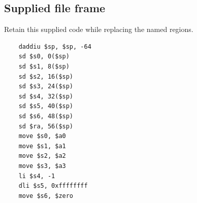 \subsection*{Supplied file frame}
Retain this supplied code while replacing the named regions.

\begin{verbatim}
    daddiu $sp, $sp, -64
    sd $s0, 0($sp)
    sd $s1, 8($sp)
    sd $s2, 16($sp)
    sd $s3, 24($sp)
    sd $s4, 32($sp)
    sd $s5, 40($sp)
    sd $s6, 48($sp)
    sd $ra, 56($sp)
    move $s0, $a0
    move $s1, $a1
    move $s2, $a2
    move $s3, $a3
    li $s4, -1
    dli $s5, 0xffffffff
    move $s6, $zero
\end{verbatim}
